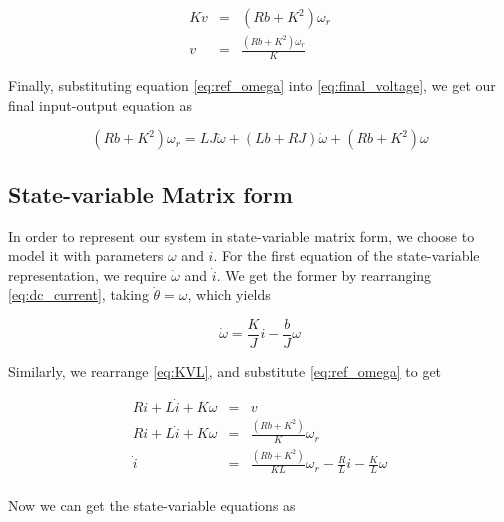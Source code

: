 \documentclass[a4paper, 12pt]{article}
\begin{document}
\begin{equation}
  \begin{array}{rcl}
    Kv & = & (Rb + K^2)\omega_r \\
    v & = & \frac{(Rb + K^2)\omega_r}{K}
  \end{array}
  \label{eq:ref_omega}
\end{equation}

Finally, substituting equation \eqref{eq:ref_omega} into
\eqref{eq:final_voltage}, we get our final input-output equation as

\begin{equation}
  (Rb + K^2)\omega_r = LJ\ddot\omega + (Lb + RJ)\dot\omega + (Rb + K^2)\omega
  \label{eq:final_ref_omega}
\end{equation}

\subsection{State-variable Matrix form}
In order to represent our system in state-variable matrix form, we choose to
model it with parameters $\omega$ and $i$. For the first equation of the
state-variable representation, we require $\dot\omega$ and $\dot i$. We get the
former by rearranging \eqref{eq:dc_current}, taking $\dot\theta = \omega$,
which yields

\begin{equation}
  \dot\omega = \frac{K}{J} i - \frac{b}{J} \omega
  \label{eq:ss_omega_dot}
\end{equation}

Similarly, we rearrange \eqref{eq:KVL}, and substitute \eqref{eq:ref_omega} to
get

\begin{equation}
  \begin{array}{rcl}
    Ri + L\dot i + K\omega & = & v \\
    Ri + L\dot i + K\omega & = & \frac{(Rb + K^2)}{K}\omega_r \\
    \dot i & = & \frac{(Rb + K^2)}{KL}\omega_r - \frac{R}{L} i - \frac{K}{L}\omega \\
  \end{array}
  \label{eq:ss_i_dot}
\end{equation}

Now we can get the state-variable equations as
\end{document}
